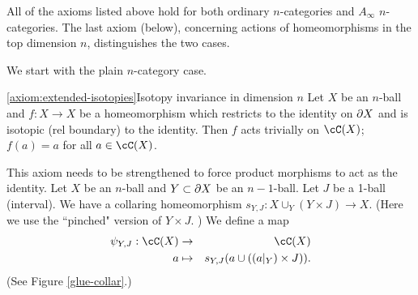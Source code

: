 All of the axioms listed above hold for both ordinary $n$-categories and $A_\infty$ $n$-categories.
The last axiom (below), concerning actions of 
homeomorphisms in the top dimension $n$, distinguishes the two cases.

We start with the plain $n$-category case.

\begin{preliminary-axiom}{\ref{axiom:extended-isotopies}}{Isotopy invariance in dimension $n$}
Let $X$ be an $n$-ball and $f: X\to X$ be a homeomorphism which restricts
to the identity on $\partial X$ and is isotopic (rel boundary) to the identity.
Then $f$ acts trivially on $\cC(X)$; $f(a) = a$ for all $a\in \cC(X)$.
\end{preliminary-axiom}

This axiom needs to be strengthened to force product morphisms to act as the identity.
Let $X$ be an $n$-ball and $Y\subset\partial X$ be an $n{-}1$-ball.
Let $J$ be a 1-ball (interval).
We have a collaring homeomorphism $s_{Y,J}: X\cup_Y (Y\times J) \to X$.
(Here we use the ``pinched" version of $Y\times J$.
)
We define a map
\begin{eqnarray*}
	\psi_{Y,J}: \cC(X) &\to& \cC(X) \\
	a & \mapsto & s_{Y,J}(a \cup ((a|_Y)\times J)) .
\end{eqnarray*}
(See Figure \ref{glue-collar}.)
